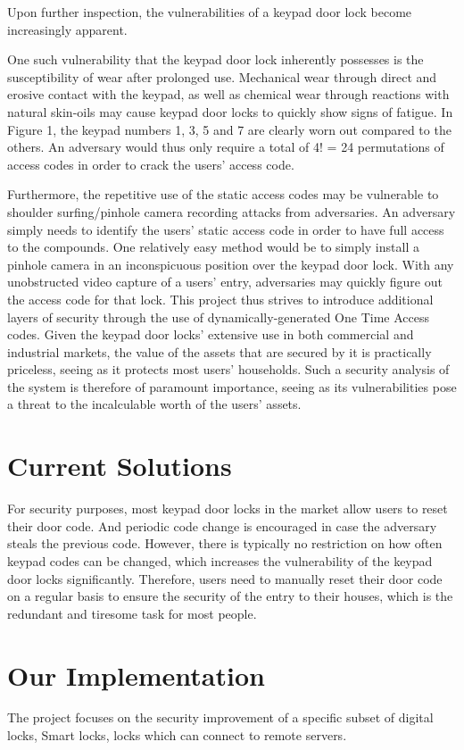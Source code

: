 \documentclass[conference]{IEEEtran}
\begin{document}
Upon further inspection, the vulnerabilities of a keypad door lock become increasingly apparent. 

One such vulnerability that the keypad door lock inherently possesses is  the susceptibility of wear after prolonged use. Mechanical wear through direct and erosive contact with the keypad, as well as chemical wear through reactions with natural skin-oils may cause keypad door locks to quickly show signs of fatigue. In Figure 1, the keypad numbers 1, 3, 5 and 7 are clearly worn out compared to the others. An adversary would thus only require a total of 4! = 24 permutations of access codes in order to crack the users’ access code.

Furthermore, the repetitive use of the static access codes may be vulnerable to shoulder surfing/pinhole camera recording attacks from adversaries. An adversary simply needs to identify the users’ static access code in order to have full access to the compounds. One relatively easy method would be to simply install a pinhole camera in an inconspicuous position over the keypad door lock. With any unobstructed video capture of a users’ entry, adversaries may quickly figure out the access code for that lock.
This project thus strives to introduce additional layers of security through the use of dynamically-generated One Time Access codes. Given the keypad door locks’ extensive use in both commercial and industrial markets, the value of the assets that are secured by it is practically priceless, seeing as it protects most users’ households. Such a security analysis of the system is therefore of paramount importance, seeing as its vulnerabilities pose a threat to the incalculable worth of the users’ assets. 

\section{Current Solutions}
For security purposes, most keypad door locks in the market allow users to reset their door code. And periodic code change is encouraged in case the adversary steals the previous code. However, there is typically no restriction on how often keypad codes can be changed, which increases the vulnerability of the keypad door locks significantly.
Therefore, users need to manually reset their door code on a regular basis to ensure the security of the entry to their houses, which is the redundant and tiresome task for most people.

\section{Our Implementation}
The project focuses on the security improvement of a specific subset of digital locks, Smart locks, locks which can connect to remote servers.
\end{document}
